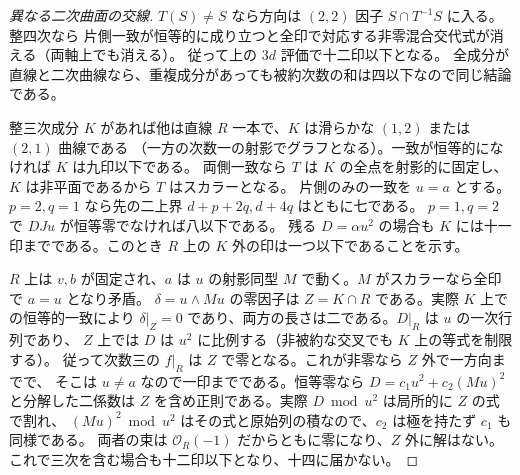 \begin{proof}[異なる二次曲面の交線]
$T(S)\ne S$ なら方向は $(2,2)$ 因子 $S\cap T^{-1}S$ に入る。整四次なら
片側一致が恒等的に成り立つと全印で対応する非零混合交代式が消える（両軸上でも消える）。
従って上の $3d$ 評価で十二印以下となる。
全成分が直線と二次曲線なら、重複成分があっても被約次数の和は四以下なので同じ結論である。

整三次成分 $K$ があれば他は直線 $R$ 一本で、$K$ は滑らかな $(1,2)$ または $(2,1)$ 曲線である
（一方の次数一の射影でグラフとなる）。一致が恒等的になければ $K$ は九印以下である。
両側一致なら $T$ は $K$ の全点を射影的に固定し、$K$ は非平面であるから $T$ はスカラーとなる。
片側のみの一致を $u=a$ とする。$p=2,q=1$ なら先の二上界 $d+p+2q,d+4q$ はともに七である。
$p=1,q=2$ で $D Ju$ が恒等零でなければ八以下である。
残る $D=\alpha u^2$ の場合も $K$ には十一印までである。このとき $R$ 上の $K$ 外の印は一つ以下であることを示す。

$R$ 上は $v,b$ が固定され、$a$ は $u$ の射影同型 $M$ で動く。$M$ がスカラーなら全印で $a=u$ となり矛盾。
$\delta=u\wedge Mu$ の零因子は $Z=K\cap R$ である。実際 $K$ 上での恒等的一致により
$\delta|_Z=0$ であり、両方の長さは二である。$D|_R$ は $u$ の一次行列であり、
$Z$ 上では $D$ は $u^2$ に比例する（非被約な交叉でも $K$ 上の等式を制限する）。
従って次数三の $f|_R$ は $Z$ で零となる。これが非零なら $Z$ 外で一方向までで、
そこは $u\ne a$ なので一印までである。恒等零なら $D=c_1 u^2+c_2(Mu)^2$ と分解した二係数は
$Z$ を含め正則である。実際 $D\bmod u^2$ は局所的に $Z$ の式で割れ、
$(Mu)^2\bmod u^2$ はその式と原始列の積なので、$c_2$ は極を持たず $c_1$ も同様である。
両者の束は $\mathcal O_R(-1)$ だからともに零になり、$Z$ 外に解はない。
これで三次を含む場合も十二印以下となり、十四に届かない。
\end{proof}

